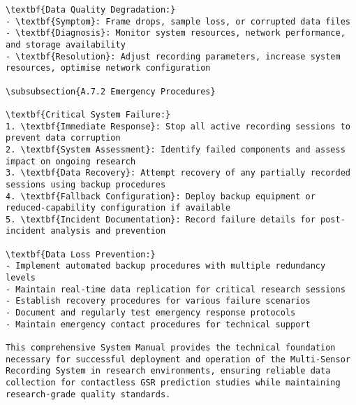 \begin{verbatim}
\textbf{Data Quality Degradation:}
- \textbf{Symptom}: Frame drops, sample loss, or corrupted data files
- \textbf{Diagnosis}: Monitor system resources, network performance, and storage availability
- \textbf{Resolution}: Adjust recording parameters, increase system resources, optimise network configuration

\subsubsection{A.7.2 Emergency Procedures}

\textbf{Critical System Failure:}
1. \textbf{Immediate Response}: Stop all active recording sessions to prevent data corruption
2. \textbf{System Assessment}: Identify failed components and assess impact on ongoing research
3. \textbf{Data Recovery}: Attempt recovery of any partially recorded sessions using backup procedures
4. \textbf{Fallback Configuration}: Deploy backup equipment or reduced-capability configuration if available
5. \textbf{Incident Documentation}: Record failure details for post-incident analysis and prevention

\textbf{Data Loss Prevention:}
- Implement automated backup procedures with multiple redundancy levels
- Maintain real-time data replication for critical research sessions
- Establish recovery procedures for various failure scenarios
- Document and regularly test emergency response protocols
- Maintain emergency contact procedures for technical support

This comprehensive System Manual provides the technical foundation necessary for successful deployment and operation of the Multi-Sensor Recording System in research environments, ensuring reliable data collection for contactless GSR prediction studies while maintaining research-grade quality standards.
\end{verbatim}

